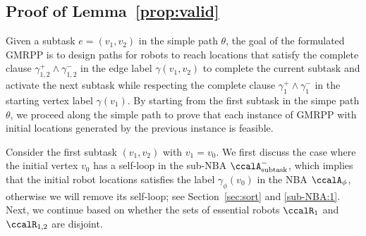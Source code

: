 \documentclass[Afour,sageh,times]{sagej}
\newcounter{mycounter}
\newcommand{\auto}[1]{\ccalA_{\textup{#1}}}
\newcommand{\autop}{\ccalA_{\phi}}
\begin{document}
{{%




\subsection{Proof of Lemma~\ref{prop:valid}}\label{app:valid}
Given a subtask $e = (v_1, v_2)$ in the simple path $\theta$, the goal of the formulated  GMRPP is to design paths for robots to reach locations that satisfy the complete clause $\gamma_{1,2}^+ \wedge \gamma_{1,2}^-$ in the edge label $\gamma(v_1, v_2)$ to complete the current subtask and activate the next subtask while respecting the complete clause $\gamma_1^+ \wedge \gamma_1^-$ in the starting vertex label $\gamma(v_1)$. By starting from the first subtask in the simpe path $\theta$, we proceed along the simple path to prove that each instance of GMRPP with initial locations generated by the previous instance is feasible.


Consider the first subtask $(v_1, v_2)$ with $v_1 = v_0$. We first discuss the case where  the initial vertex $v_0$ has a self-loop in the sub-NBA $\auto{subtask}^-$, which implies that the initial robot locations satisfies the label $\gamma_{\phi}(v_0)$ in the NBA $\autop$, otherwise we will remove its self-loop; see Section~\ref{sec:sort} and \ref{sub-NBA:1}. Next, we continue based on whether the sets of essential robots $\ccalR_1$ and $\ccalR_{1,2}$ are disjoint.
}}
\end{document}
